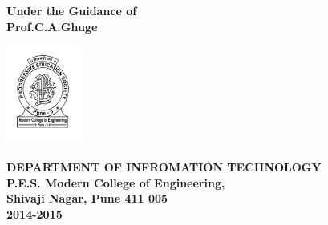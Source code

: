 \documentclass[12pt,a4paper]{article}
\begin{document}
	\vspace{0.2 in}
	
	\begin{center}
	  \textbf{Under the Guidance of}\\
	   \textbf{Prof.C.A.Ghuge}
	\end{center}
		\vspace{0.2 in}
		
		
\begin{center}
\includegraphics[width=2.5cm]{modernlogo}
\end{center}

		\begin{center}
	  \textbf{DEPARTMENT OF INFROMATION TECHNOLOGY}\\
\bf{P.E.S. Modern College of Engineering, } \\
\textbf{Shivaji Nagar, Pune 411 005}\\
\textbf{2014-2015}
	\end{center}
\end{document}
